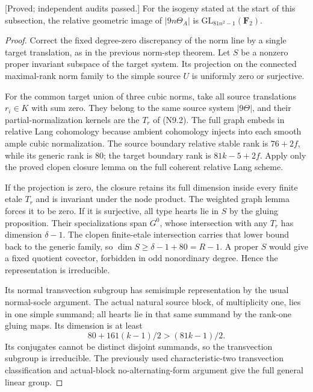 \begin{theorem}
\label{thm:nine-theta-arbitrary-odd-norm-candidate}
\textup{[Proved; independent audits passed.]}
For the isogeny stated at the start of this subsection, the relative
geometric image of $|9n\Theta_A|$ is
$\mathrm{GL}_{81n^2-1}(\mathbf F_2)$.
\end{theorem}

\begin{proof}
Correct the fixed degree-zero discrepancy of the norm line by a
single target translation, as in the previous norm-step theorem.
Let $S$ be a nonzero proper invariant subspace of the target
system. Its projection on the connected maximal-rank norm family
to the simple source $U$ is uniformly zero or surjective.

For the common target union of three cubic norms, take all source
translations $r_i\in K$ with sum zero. They belong to the same
source system $|9\Theta|$, and their partial-normalization kernels
are the $T_r$ of (N9.2). The full graph embeds in relative Lang
cohomology because ambient cohomology injects into each smooth
ample cubic normalization. The source boundary relative stable
rank is $76+2f$, while its generic rank is $80$; the target
boundary rank is $81k-5+2f$. Apply only the proved clopen closure
lemma on the full coherent relative Lang scheme.

If the projection is zero, the closure retains its full dimension
inside every finite etale $T_r$ and is invariant under the node
product. The weighted graph lemma forces it to be zero. If it is
surjective, all type hearts lie in $S$ by the gluing proposition.
Their specializations span $G^0$, whose intersection with any
$T_r$ has dimension $\delta-1$. The clopen finite-etale
intersection carries that lower bound back to the generic family,
so $\dim S\ge\delta-1+80=R-1$. A proper $S$ would give a fixed
quotient covector, forbidden in odd nonordinary degree. Hence the
representation is irreducible.

Its normal transvection subgroup has semisimple representation
by the usual normal-socle argument. The actual natural source
block, of multiplicity one, lies in one simple summand; all hearts
lie in that same summand by the rank-one gluing maps. Its dimension
is at least
\[
              80+161(k-1)/2>(81k-1)/2.
\]
Its conjugates cannot be distinct disjoint summands, so the
transvection subgroup is irreducible. The previously used
characteristic-two transvection classification and actual-block
no-alternating-form argument give the full general linear group.
\end{proof}

